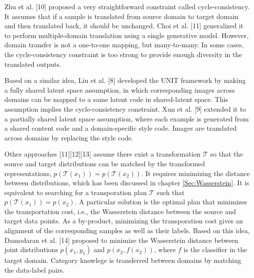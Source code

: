 \documentclass{article}
\begin{document}
Zhu et al. [10] proposed a very straightforward constraint called cycle-consistency. It assumes that if a sample is translated from source domain to target domain and then translated back, it should be unchanged. Choi et al. [11] generalized it to perform multiple-domain translation using a single generative model. However, domain transfer is not a one-to-one mapping, but many-to-many. In some cases, the cycle-consistency constraint is too strong to provide enough diversity in the translated outputs.

Based on a similar idea, Liu et al. [8] developed the UNIT framework by making a fully shared latent space assumption, in which corresponding images across domains can be mapped to a same latent code in shared-latent space. This assumption implies the cycle-consistency constraint. Xun et al. [9] extended it to a partially shared latent space assumption, where each example is generated from a shared content code and a domain-specific style code. Images are translated across domains by replacing the style code.


Other approaches [11][12][13] assume there exist a transformation $\mathcal{T}$ so that the source and target distributions can be matched by the transformed representations, $p(\mathcal{T}(x_1)) = p(\mathcal{T}(x_2))$. It requires minimizing the distance between distributions, which has been discussed in chapter \ref{Sec:Wasserstein}. It is equivalent to searching for a transporation plan $\mathcal{T}$ such that $p(\mathcal{T}(x_1)) = p(x_2)$. A particular solution is the optimal plan that minimizes the transportation cost, i.e., the Wasserstein distance between the source and target data points. As a by-product, minimizing the transporation cost gives an alignment of the corresponding samples as well as their labels. Based on this idea, Damodaran et al. [14] proposed to minimize the Wasserstein distance between joint distributions $p(x_1, y_1)$ and $p(x_2, f(x_2))$, where $f$ is the classifier in the target domain. Category knowlege is transferred between domains by matching the data-label pairs.
\end{document}

